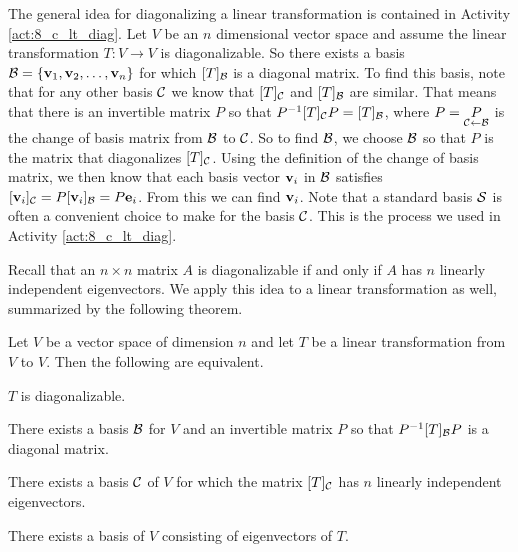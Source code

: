 The general idea for diagonalizing a linear transformation is contained in Activity \ref{act:8_c_lt_diag}. Let $V$ be an $n$ dimensional vector space and assume the linear transformation $T : V \to V$ is diagonalizable. So there exists a basis $\mathcal{B} = \{\mathbf{v}_1, \mathbf{v}_2, \ldots, \mathbf{v}_n\}$ for which $[T]_{\mathcal{B}}$ is a diagonal matrix. To find this basis, note that for any other basis $\mathcal{C}$ we know that $[T]_{\mathcal{C}}$ and $[T]_{\mathcal{B}}$ are similar. That means that there is an invertible matrix $P$ so that $P^{-1}[T]_{\mathcal{C}}P = [T]_{\mathcal{B}}$, where $P= \underset{\mathcal{C} \leftarrow \mathcal{B}}{P}$ is the change of basis matrix from $\mathcal{B}$ to $\mathcal{C}$. So to find $\mathcal{B}$, we choose $\mathcal{B}$ so that $P$ is the matrix that diagonalizes $[T]_{\mathcal{C}}$. Using the definition of the change of basis matrix, we then know that each basis vector $\mathbf{v}_i$ in $\mathcal{B}$ satisfies $[\mathbf{v}_i]_{\mathcal{C}}=P[\mathbf{v}_i]_{\mathcal{B}}= P \mathbf{e}_i$. From this we can find $\mathbf{v}_i$. Note that a standard basis $\mathcal{S}$ is often a convenient choice to make for the basis $\mathcal{C}$. This is the process we used in Activity \ref{act:8_c_lt_diag}.

Recall that an $n \times n$ matrix $A$ is diagonalizable if and only if $A$ has $n$ linearly independent eigenvectors. We apply this idea to a linear transformation as well, summarized by the following theorem. 

\begin{theorem} Let $V$ be a vector space of dimension $n$ and let $T$ be a linear transformation from $V$ to $V$. Then the following are equivalent.
	\be
	\item $T$ is diagonalizable. 
	\item There exists a basis $\mathcal{B}$ for $V$ and an invertible matrix $P$ so that $P^{-1}[T]_{\mathcal{B}}P$ is a diagonal matrix.
	\item There exists a basis $\mathcal{C}$ of $V$ for which the matrix $[T]_{\mathcal{C}}$ has $n$ linearly independent eigenvectors.
	\item There exists a basis of $V$ consisting of eigenvectors of $T$.
	\ee
\end{theorem}


\ExampleIntro

